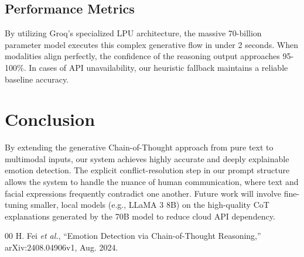 \documentclass[11pt, conference, a4paper]{IEEEtran}
\begin{document}
\subsection{Performance Metrics}
By utilizing Groq's specialized LPU architecture, the massive 70-billion parameter model executes this complex generative flow in under 2 seconds. When modalities align perfectly, the confidence of the reasoning output approaches 95-100\%. In cases of API unavailability, our heuristic fallback maintains a reliable baseline accuracy.

\section{Conclusion}
By extending the generative Chain-of-Thought approach from pure text to multimodal inputs, our system achieves highly accurate and deeply explainable emotion detection. The explicit conflict-resolution step in our prompt structure allows the system to handle the nuance of human communication, where text and facial expressions frequently contradict one another. Future work will involve fine-tuning smaller, local models (e.g., LLaMA 3 8B) on the high-quality CoT explanations generated by the 70B model to reduce cloud API dependency.

\begin{thebibliography}{00}
H. Fei \textit{et al.}, ``Emotion Detection via Chain-of-Thought Reasoning,'' arXiv:2408.04906v1, Aug. 2024.
\end{thebibliography}
\end{document}
